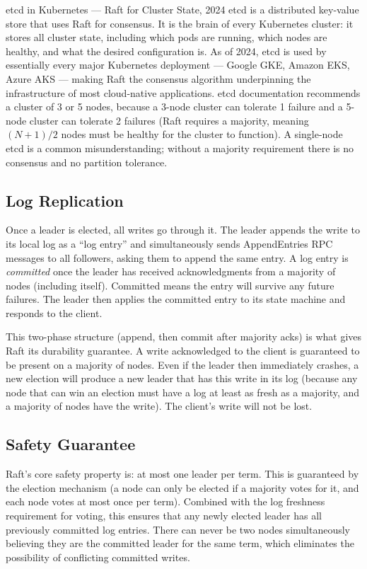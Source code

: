 \documentclass[11pt,a4paper]{article}
\begin{document}
\begin{industrybox}{etcd in Kubernetes --- Raft for Cluster State, 2024}
etcd is a distributed key-value store that uses Raft for consensus. It is the brain of every Kubernetes cluster: it stores all cluster state, including which pods are running, which nodes are healthy, and what the desired configuration is. As of 2024, etcd is used by essentially every major Kubernetes deployment --- Google GKE, Amazon EKS, Azure AKS --- making Raft the consensus algorithm underpinning the infrastructure of most cloud-native applications. etcd documentation recommends a cluster of 3 or 5 nodes, because a 3-node cluster can tolerate 1 failure and a 5-node cluster can tolerate 2 failures (Raft requires a majority, meaning $(N+1)/2$ nodes must be healthy for the cluster to function). A single-node etcd is a common misunderstanding; without a majority requirement there is no consensus and no partition tolerance.
\end{industrybox}

\subsection{Log Replication}

Once a leader is elected, all writes go through it. The leader appends the write to its local log as a ``log entry'' and simultaneously sends AppendEntries RPC messages to all followers, asking them to append the same entry. A log entry is \textit{committed} once the leader has received acknowledgments from a majority of nodes (including itself). Committed means the entry will survive any future failures. The leader then applies the committed entry to its state machine and responds to the client.

This two-phase structure (append, then commit after majority acks) is what gives Raft its durability guarantee. A write acknowledged to the client is guaranteed to be present on a majority of nodes. Even if the leader then immediately crashes, a new election will produce a new leader that has this write in its log (because any node that can win an election must have a log at least as fresh as a majority, and a majority of nodes have the write). The client's write will not be lost.

\subsection{Safety Guarantee}

Raft's core safety property is: at most one leader per term. This is guaranteed by the election mechanism (a node can only be elected if a majority votes for it, and each node votes at most once per term). Combined with the log freshness requirement for voting, this ensures that any newly elected leader has all previously committed log entries. There can never be two nodes simultaneously believing they are the committed leader for the same term, which eliminates the possibility of conflicting committed writes.
\end{document}
